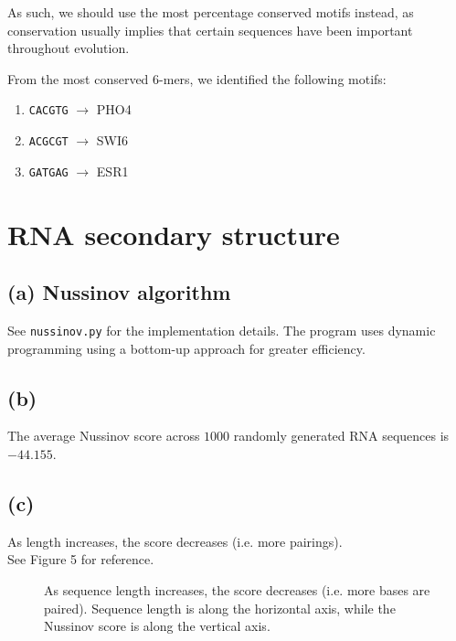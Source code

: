 \documentclass[11pt]{article}
\begin{document}
As such, we should use the most percentage conserved motifs
instead, as conservation usually implies that certain sequences
have been important throughout evolution.

From the most conserved $6$-mers, we identified the following
motifs:
\begin{enumerate}[noitemsep]
\item {\tt CACGTG} $\rightarrow$ PHO4
\item {\tt ACGCGT} $\rightarrow$ SWI6
\item {\tt GATGAG} $\rightarrow$ ESR1

\end{enumerate}

\section{RNA secondary structure}
\subsection*{(a) Nussinov algorithm}
See {\tt nussinov.py} for the implementation details. The
program uses dynamic programming using a bottom-up
approach for greater efficiency.

\subsection*{(b)}
The average Nussinov score across $1000$ randomly generated
RNA sequences is $-44.155$.

\subsection*{(c)}
As length increases, the score decreases (i.e. more pairings).\\

\noindent See Figure 5 for reference.

\begin{figure}[h]
\noindent{}
\caption{As sequence length increases, the score decreases (i.e. more
bases are paired). Sequence length is along the horizontal axis, while
the Nussinov score is along the vertical axis.}
\end{figure}
\end{document}
